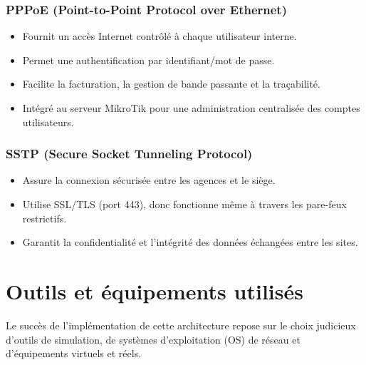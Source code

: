 \subsubsection*{\texorpdfstring{\gls{PPPoE}}{PPPoE} (Point-to-Point Protocol over Ethernet)}
    \begin{itemize}
    \item Fournit un accès Internet contrôlé à chaque utilisateur interne.
    \item Permet une authentification par identifiant/mot de passe.
    \item Facilite la facturation, la gestion de bande passante et la traçabilité.
    \item Intégré au serveur MikroTik pour une administration centralisée des comptes utilisateurs.
\end{itemize}

   \subsubsection*{\texorpdfstring{\gls{SSTP}}{SSTP} (Secure Socket Tunneling Protocol)}

\begin{itemize}
    \item Assure la connexion sécurisée entre les agences et le siège.
    \item Utilise \gls{SSL}\//\gls{TLS} (port 443), donc fonctionne même à travers les pare-feux restrictifs.
    \item Garantit la confidentialité et l’intégrité des données échangées entre les sites.
\end{itemize}

\section{Outils et équipements utilisés}
Le succès de l'implémentation de cette architecture repose sur le choix judicieux
d'outils de simulation, de systèmes d'exploitation (\gls{OS}) de réseau et d'équipements
virtuels et réels.
